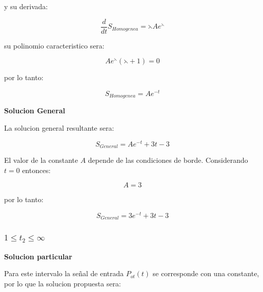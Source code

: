 \documentclass[a4paper,12pt]{article}
\begin{document}
y su derivada:

\begin{equation}
\frac{d}{dt}S_{Homogenea}=\leftthreetimes A e^{\leftthreetimes}
\end{equation}

su polinomio caracteristico sera:

\begin{equation}
A e^{\leftthreetimes}(\leftthreetimes + 1)=0
\end{equation}

por lo tanto:\par

\begin{equation}
S_{Homogenea}=A e^{-t}
\end{equation}

\vspace*{0.2in}

\textbf{Solucion General}\par
\vspace*{0.2in}

La solucion general resultante sera:\par

\begin{equation}
S_{General}=A e^{-t} + 3t-3
\end{equation}

El valor de la constante $A$ depende de las condiciones de borde. Considerando $t=0$ entonces:

\begin{equation}
A=3
\end{equation}

por lo tanto:\par

\begin{equation}
S_{General}=3 e^{-t} + 3t-3
\end{equation}


\subsubsection{$1 \leq t_{2} \leq \infty$}
\vspace*{0.3in}
\textbf{Solucion particular}\par
\vspace*{0.1in}

Para este intervalo la señal de entrada $P_{ot}(t)$ se corresponde con una constante, por lo que la solucion propuesta sera:\par
\end{document}
